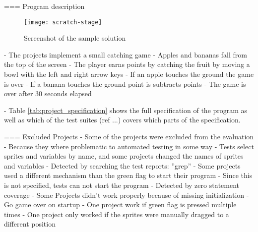 === Program description
\begin{wrapfigure}{r}{0.35\textwidth + 5mm}
    \centering
    \vspace{-3mm}
    \texttt{[image: scratch-stage]}
    \caption{Screenshot of the sample solution}
    \label{fig:screenshot_of_the_sample_solution}
\end{wrapfigure}
- The projects implement a small catching game
- Apples and bananas fall from the top of the screen
- The player earns points by catching the fruit by moving a bowl with the left and right arrow keys
- If an apple touches the ground the game is over
- If a banana touches the ground point is subtracts points
- The game is over after 30 seconds elapsed

- Table \ref{tab:project_specification} shows the full specification of the program as well as which of the test suites (ref ...) covers which parts of the specification.

=== Excluded Projects
- Some of the projects were excluded from the evaluation
- Because they where problematic to automated testing in some way
    - Tests select sprites and variables by name, and some projects changed the names of sprites and variables
        - Detected by searching the test reports: ''grep''
    - Some projects used a different mechanism than the green flag to start their program
        - Since this is not specified, tests can not start the program
        - Detected by zero statement coverage
    - Some Projects didn't work properly because of missing initialization
        - Go game over on startup
        - One project work if green flag is pressed multiple times
        - One project only worked if the sprites were manually dragged to a different position

